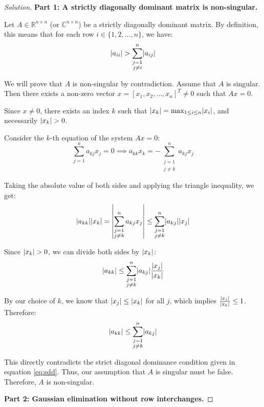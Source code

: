 \documentclass[11pt, a4paper]{article}
\newcommand{\R}{\mathbb{R}}
\newcommand{\C}{\mathbb{C}}
\DeclarePairedDelimiter\abs{\lvert}{\rvert}
\newif\ifsolutionnewpage
\newenvironment{solution}
  {\begin{proof}[Solution]}
  {\end{proof}\ifsolutionnewpage\newpage\fi}
\begin{document}
\begin{solution}
    \textbf{Part 1: A strictly diagonally dominant matrix is non-singular.}
    
    Let $A \in \R^{n \times n}$ (or $\C^{n \times n}$) be a strictly diagonally dominant matrix. By definition, this means that for each row $i \in \{1, 2, \dots, n\}$, we have:
    \begin{equation}
        \abs{a_{ii}} > \sum_{\substack{j=1 \\ j \neq i}}^n \abs{a_{ij}} \label{eq:sdd}
    \end{equation}
    
    We will prove that $A$ is non-singular by contradiction. Assume that $A$ is singular. Then there exists a non-zero vector $x = [x_1, x_2, \dots, x_n]^T \neq 0$ such that $Ax = 0$.
    
    Since $x \neq 0$, there exists an index $k$ such that $\abs{x_k} = \max_{1 \le i \le n} \abs{x_i}$, and necessarily $\abs{x_k} > 0$. 
    
    Consider the $k$-th equation of the system $Ax = 0$:
    \[
    \sum_{j=1}^n a_{kj} x_j = 0 \implies a_{kk} x_k = -\sum_{\substack{j=1 \\ j \neq k}}^n a_{kj} x_j
    \]
    
    Taking the absolute value of both sides and applying the triangle inequality, we get:
    \[
    \abs{a_{kk}} \abs{x_k} = \abs*{\sum_{\substack{j=1 \\ j \neq k}}^n a_{kj} x_j} \le \sum_{\substack{j=1 \\ j \neq k}}^n \abs{a_{kj}} \abs{x_j}
    \]
    
    Since $\abs{x_k} > 0$, we can divide both sides by $\abs{x_k}$:
    \[
    \abs{a_{kk}} \le \sum_{\substack{j=1 \\ j \neq k}}^n \abs{a_{kj}} \frac{\abs{x_j}}{\abs{x_k}}
    \]
    
    By our choice of $k$, we know that $\abs{x_j} \le \abs{x_k}$ for all $j$, which implies $\frac{\abs{x_j}}{\abs{x_k}} \le 1$. Therefore:
    \[
    \abs{a_{kk}} \le \sum_{\substack{j=1 \\ j \neq k}}^n \abs{a_{kj}}
    \]
    
    This directly contradicts the strict diagonal dominance condition given in equation \eqref{eq:sdd}. Thus, our assumption that $A$ is singular must be false. Therefore, $A$ is non-singular.

    \vspace{1em}
    \textbf{Part 2: Gaussian elimination without row interchanges.}
    

\end{solution}
\end{document}
